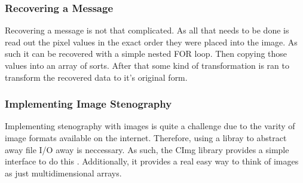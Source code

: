 \documentclass[12pt]{article}
\begin{document}
    
    \subsubsection{Recovering a Message}    
      Recovering a message is not that complicated. As all that needs
      to be done is read out the pixel values in the exact order they
      were placed into the image. As such it can be recovered with a
      simple nested FOR loop. Then copying those values into an array
      of sorts. After that some kind of transformation is ran to
      transform the recovered data to it's original form.

    \subsubsection{Implementing Image Stenography}
      Implementing stenography with images is quite a challenge due to
      the varity of image formats available on the internet. Therefore,
      using a libray to abstract away file I/O away is neccessary.  As
      such, the CImg library provides a simple interface to do this
      \cite{cimg}. Additionally, it provides a real easy way to think of
      images as just multidimensional arrays.



\end{document}
